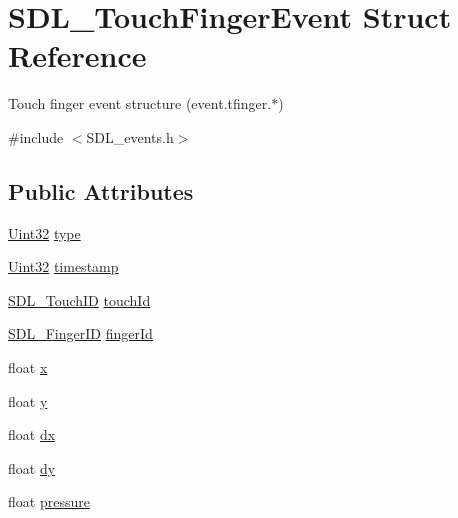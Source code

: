 \hypertarget{struct_s_d_l___touch_finger_event}{}\section{S\+D\+L\+\_\+\+Touch\+Finger\+Event Struct Reference}
\label{struct_s_d_l___touch_finger_event}


Touch finger event structure (event.\+tfinger.$\ast$)  




{\ttfamily \#include $<$S\+D\+L\+\_\+events.\+h$>$}

\subsection*{Public Attributes}
\begin{DoxyCompactItemize}
\item 
\mbox{\hyperlink{_s_d_l__stdinc_8h_add440eff171ea5f55cb00c4a9ab8672d}{Uint32}} \mbox{\hyperlink{struct_s_d_l___touch_finger_event_a3883218fa3426065ca66086c100edbfa}{type}}
\item 
\mbox{\hyperlink{_s_d_l__stdinc_8h_add440eff171ea5f55cb00c4a9ab8672d}{Uint32}} \mbox{\hyperlink{struct_s_d_l___touch_finger_event_abde2ab5cb013bbd21e37a65e2f8fa666}{timestamp}}
\item 
\mbox{\hyperlink{_s_d_l__touch_8h_a10f5f86abe4ea8308a8706bd5d3b337a}{S\+D\+L\+\_\+\+Touch\+ID}} \mbox{\hyperlink{struct_s_d_l___touch_finger_event_ad7a6f39ec9af1bf47b160d18314edd70}{touch\+Id}}
\item 
\mbox{\hyperlink{_s_d_l__touch_8h_a5fa58141f78415ca09645af359ad2250}{S\+D\+L\+\_\+\+Finger\+ID}} \mbox{\hyperlink{struct_s_d_l___touch_finger_event_a8616d46ed19906e3ee90a4d481d3a284}{finger\+Id}}
\item 
float \mbox{\hyperlink{struct_s_d_l___touch_finger_event_a0ce44b1342220fa17e9b9b4a77c2c906}{x}}
\item 
float \mbox{\hyperlink{struct_s_d_l___touch_finger_event_ac2bb8af638d2927a8e13f6ffe8f9384e}{y}}
\item 
float \mbox{\hyperlink{struct_s_d_l___touch_finger_event_ac6acac209d6e2bd659fdb6760081393d}{dx}}
\item 
float \mbox{\hyperlink{struct_s_d_l___touch_finger_event_a9c0320c5f18a6b9d10da657e166608c9}{dy}}
\item 
float \mbox{\hyperlink{struct_s_d_l___touch_finger_event_ab4fca822d0807b5748dbae8d3cc56524}{pressure}}
\end{DoxyCompactItemize}


